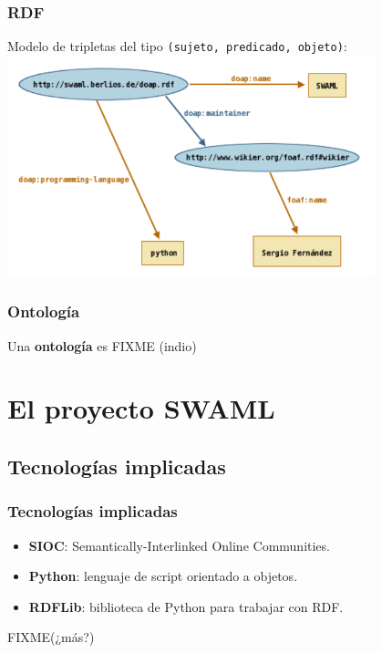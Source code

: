 \documentclass[spanish,notes=hide]{beamer}
\begin{document}
\frame
{
  \frametitle{RDF}


  \begin{center}
    Modelo de tripletas del tipo \texttt{(sujeto, predicado, objeto)}:
    \includegraphics[width=0.8\textwidth]{images/grafo-rdf.png}
  \end{center}


}
\frame
{
  \frametitle{Ontología}

  Una \textbf{ontología} es FIXME (indio)
}

\section{El proyecto SWAML}

\subsection{Tecnologías implicadas}
\frame
{
  \frametitle{Tecnologías implicadas}

  \begin{itemize}
    \item<2-> \textbf{SIOC}: Semantically-Interlinked Online Communities.
    \item<3-> \textbf{Python}: lenguaje de script orientado a objetos.
    \item<4-> \textbf{RDFLib}: biblioteca de Python para trabajar con RDF.
  \end{itemize}
  FIXME(¿más?)
}
\end{document}
